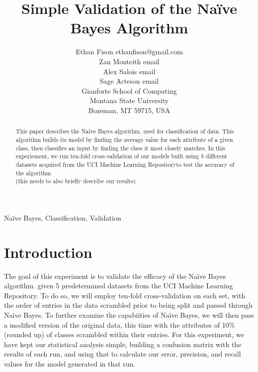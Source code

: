 \documentclass[twoside,11pt]{article}
\begin{document}
\title{Simple Validation of the Naïve Bayes Algorithm}

\author{\name Ethan Fison \email ethanfison@gmail.com \\
        \name Zan Monteith \email email \\
        \name Alex Salois \email email \\ 
        \name Sage Acteson \email email \\ 
       \addr Gianforte School of Computing\\
       Montana State University\\
       Bozeman, MT 59715, USA}



\maketitle

\begin{abstract}%
This paper describes the Na{\"i}ve Bayes algorithm, used for classification
of data. This algorithm builds its model by finding the average value for each
attribute of a given class, then classifies an input by finding the class it 
most closely matches. In this experiement, we run ten-fold cross-validation 
of our models built using 5 different datasets acquired from the UCI Machine 
Learning Repositoryto test the accuracy of the algorithm\\
(this needs to also briefly describe our results)

\end{abstract}

\begin{keywords}
  Na{\"i}ve Bayes, Classification, Validation
\end{keywords}

\section{Introduction}

The goal of this experiment is to validate the efficacy of the Naïve Bayes 
algorithm. given 5 predetermined datasets from the UCI Machine Learning Repository.
To do so, we will employ ten-fold cross-validation on each set, with the order of 
entries in the data scrambled prior to being split and passed through Naïve Bayes.
To further examine the capabiities of Naïve Bayes, we will then pass a modified 
version of the original data, this time with the attributes of 10\% (rounded up) of 
classes scrambled within their entries. For this experiment, we have kept our 
statistical analysis simple, building a confusion matrix with the results of each run,
and using that to calculate our error, \citep{Project,Precision} precision, and recall values for the model 
generated in that run.\\
\end{document}
